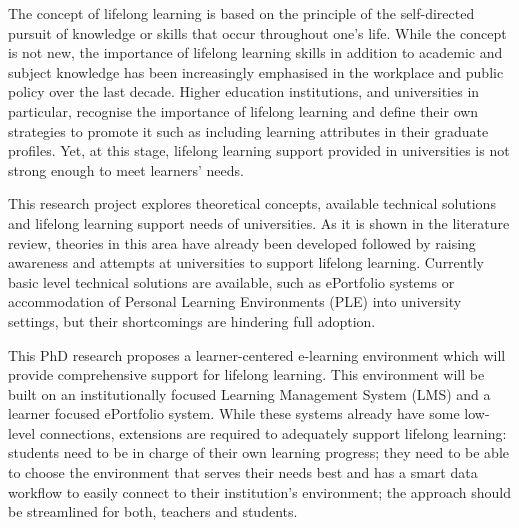 The concept of lifelong learning is based on the principle of the self-directed
pursuit of knowledge or skills that occur throughout one’s life. While the
concept is not new, the importance of lifelong learning skills in addition to
academic and subject knowledge has been increasingly emphasised in the workplace
and public policy over the last decade. Higher education institutions, and
universities in particular, recognise the importance of lifelong learning and
define their own strategies to promote it such as including learning attributes
in their graduate profiles. Yet, at this stage, lifelong learning support
provided in universities is not strong enough to meet learners' needs. 

This research project explores theoretical concepts, available technical
solutions and lifelong learning support needs of universities. As it is shown in
the literature review, theories in this area have already been developed
followed by raising awareness and attempts at universities to support lifelong
learning. Currently basic level technical solutions are available, such as
ePortfolio systems or accommodation of Personal Learning Environments (PLE) into
university settings, but their shortcomings are hindering full adoption. 

This PhD research proposes a learner-centered e-learning environment which will
provide comprehensive support for lifelong learning. This environment will be
built on an institutionally focused Learning Management System (LMS) and a
learner focused ePortfolio system. While these systems already have some
low-level connections, extensions are required to adequately support lifelong
learning: students need to be in charge of their own learning progress; they
need to be able to choose the environment that serves their needs best and has a
smart data workflow to easily connect to their institution's environment; the
approach should be streamlined for both, teachers and students. 